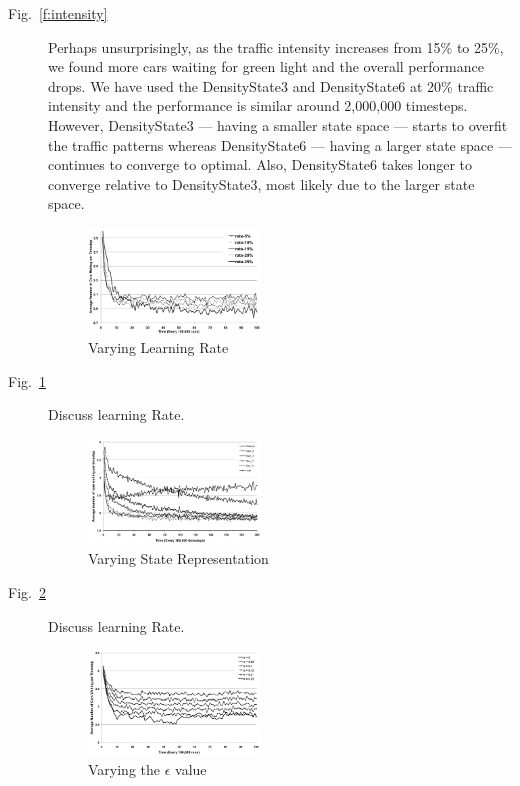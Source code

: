 \begin{description}
\item[Fig.~\ref{f:intensity}]
Perhaps unsurprisingly, as the traffic intensity increases from 15\% to
25\%, we found more cars waiting for green light and the overall performance
drops. We have used the DensityState3 and DensityState6 at 20\% traffic
intensity and the performance is similar around 2,000,000 timesteps.
However, DensityState3 --- having a smaller state space --- starts to overfit
the traffic patterns whereas DensityState6 --- having a larger state space
--- continues to converge to optimal. Also, DensityState6 takes longer to
converge relative to DensityState3, most likely due to the larger state space.


\begin{figure}
\centering
\includegraphics[width=0.45\textwidth]{learningRate}
\caption{Varying Learning Rate}\label{f:learningRate}
\end{figure}

\item[Fig.~\ref{f:learningRate}]
Discuss learning Rate.


\begin{figure}
\centering
\includegraphics[width=0.45\textwidth]{states}
\caption{Varying State Representation}\label{f:states}
\end{figure}

\item[Fig.~\ref{f:states}]
Discuss learning Rate.



\begin{figure}
\centering
\includegraphics[width=0.45\textwidth]{epsilon}
\caption{Varying the $\epsilon $ value}\label{f:epsilon}
\end{figure}


\end{description}

